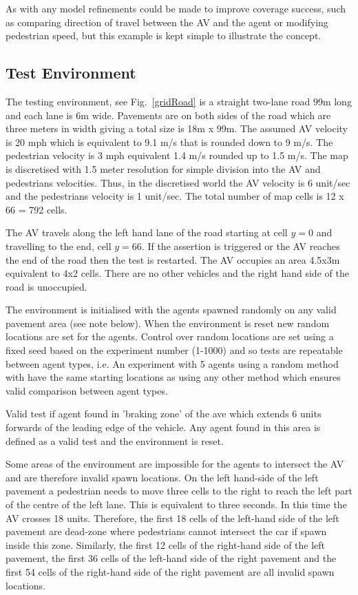 \documentclass[letterpaper, 10 pt, journal, twoside]{IEEEtran}
\begin{document}
As with any model refinements could be made to improve coverage success, such as comparing direction of travel between the AV and the agent or modifying pedestrian speed, but this example is kept simple to illustrate the concept. 

\subsection{Test Environment}
The testing environment, see Fig.~\ref{gridRoad} is a straight two-lane road 99m long and each lane is 6m wide. Pavements are on both sides of the road which are three meters in width giving a total size is 18m x 99m. 
%
The assumed AV velocity is 20 mph which is equivalent to 9.1 m/s that is rounded down to 9 m/s. The pedestrian velocity is 3 mph equivalent 1.4 m/s rounded up to 1.5 m/s. The map is discretised with 1.5 meter resolution for simple division into the AV and pedestrians velocities. Thus, in the discretised world the AV velocity is 6 unit/sec and the pedestrians velocity is 1 unit/sec. The total number of map cells is 12 x 66 = 792 cells. 

The AV travels along the left hand lane of the road starting at cell $y=0$ and travelling to the end, cell $y=66$. If the assertion is triggered or the AV reaches the end of the road then the test is restarted. The AV occupies an area 4.5x3m equivalent to 4x2 cells. There are no other vehicles and the right hand side of the road is unoccupied.

The environment is initialised with the agents spawned randomly on any valid pavement area (see note below). When the environment is reset new random locations are set for the agents. Control over random locations are set using a fixed seed based on the experiment number (1-1000) and so tests are repeatable between agent types, i.e. An experiment with 5 agents using a random method with have the same starting locations as using any other method which ensures valid comparison between agent types.

Valid test if agent found in 'braking zone' of the ave which extends 6 units forwards of the leading edge of the vehicle. Any agent found in this area is defined as a valid test and the environment is reset.

Some areas of the environment are impossible for the agents to intersect the AV and are therefore invalid spawn locations. On the left hand-side of the left pavement a pedestrian needs to move three cells to the right to reach the left part of the centre of the left lane. This is equivalent to three seconds. In this time the AV crosses 18 units. Therefore, the first 18 cells of the left-hand side of the left pavement are dead-zone where pedestrians cannot intersect the car if spawn inside this zone. Similarly, the first 12 cells of the right-hand side of the left pavement, the first 36 cells of the left-hand side of the right pavement and the first 54 cells of the right-hand side of the right pavement are all invalid spawn locations. 
\end{document}
